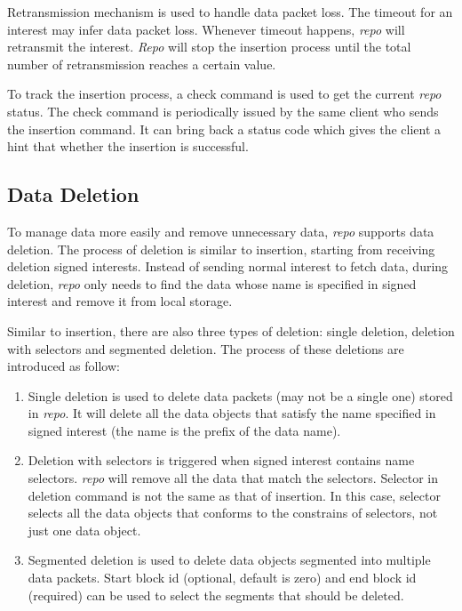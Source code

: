 \documentclass[conference]{IEEEtran}
\begin{document}
Retransmission mechanism is used to handle data packet loss. The timeout for an interest may infer data packet loss. Whenever timeout happens, \emph{repo} will retransmit the interest. \emph{Repo} will stop the insertion process until the total number of retransmission reaches a certain value.

To track the insertion process, a check command is used to get the current \emph{repo} status. The check command is periodically issued by the same client who sends the insertion command. It can bring back a status code which gives the client a hint that whether the insertion is successful.

\subsection{Data Deletion}

To manage data more easily and remove unnecessary data, \emph{repo} supports data deletion. The process of deletion is similar to insertion, starting from receiving deletion signed interests. Instead of sending normal interest to fetch data, during deletion, \emph{repo} only needs to find the data whose name is specified in signed interest and remove it from local storage.

Similar to insertion, there are also three types of deletion: single deletion, deletion with selectors and segmented deletion. The process of these deletions are introduced as follow:

\begin{enumerate}
\item Single deletion is used to delete data packets (may not be a single one) stored in \emph{repo}. It will delete all the data objects that satisfy the name specified in signed interest (the name is the prefix of the data name).
\item Deletion with selectors is triggered when signed interest contains name selectors. \emph{repo} will remove all the data that match the selectors. Selector in deletion command is not the same as that of insertion. In this case, selector selects all the data objects that conforms to the constrains of selectors, not just one data object.
\item Segmented deletion is used to delete data objects segmented into multiple data packets. Start block id (optional, default is zero) and end block id (required) can be used to select the segments that should be deleted.
\end{enumerate}
\end{document}
